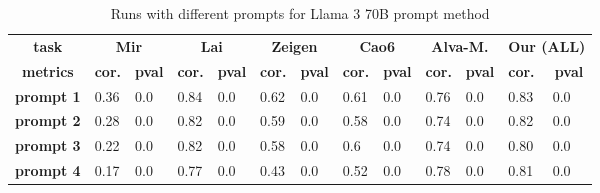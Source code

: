 \begin{table*}[]
\centering 
\begin{tabular}{@{}cllllllllllll@{}}
\toprule
\textbf{task} & \multicolumn{2}{c}{\textbf{Mir}} & \multicolumn{2}{c}{\textbf{Lai}} & \multicolumn{2}{c}{\textbf{Zeigen}} & \multicolumn{2}{c}{\textbf{Cao6}} & \multicolumn{2}{c}{\textbf{Alva-M.}} & \multicolumn{2}{l}{\textbf{Our (ALL)}} \\
\textbf{metrics} & \multicolumn{1}{c}{\textbf{cor.}} & \multicolumn{1}{c}{\textbf{pval}} & \multicolumn{1}{c}{\textbf{cor.}} & \multicolumn{1}{c}{\textbf{pval}} & \multicolumn{1}{c}{\textbf{cor.}} & \multicolumn{1}{c}{\textbf{pval}} & \multicolumn{1}{c}{\textbf{cor.}} & \multicolumn{1}{c}{\textbf{pval}} & \multicolumn{1}{c}{\textbf{cor.}} & \multicolumn{1}{c}{\textbf{pval}} & \textbf{cor.} & \multicolumn{1}{c}{\textbf{pval}} \\ \midrule
\textbf{prompt 1} & 0.36 & 0.0 & 0.84 & 0.0 & 0.62 & 0.0 & 0.61 & 0.0 & 0.76 & 0.0 & 0.83 & 0.0 \\
\textbf{prompt 2} & 0.28 & 0.0 & 0.82 & 0.0 & 0.59 & 0.0 & 0.58 & 0.0 & 0.74 & 0.0 & 0.82 & 0.0 \\
\textbf{prompt 3} & 0.22 & 0.0 & 0.82 & 0.0 & 0.58 & 0.0 & 0.6 & 0.0 & 0.74 & 0.0 & 0.80 & 0.0 \\
\textbf{prompt 4} & 0.17 & 0.0 & 0.77 & 0.0 & 0.43 & 0.0 & 0.52 & 0.0 & 0.78 & 0.0 & 0.81 & 0.0 \\ \bottomrule
\end{tabular}
\caption{Runs with different prompts for Llama 3 70B prompt method}
\label{tab:promptAbliation}
\end{table*}


